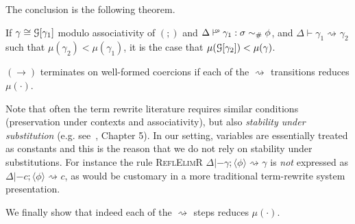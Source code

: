 \documentclass[a4paper,UKenglish]{lipics}
\def\fiddle#1{\hspace*{-0.8ex}\raisebox{0.1ex}{$\scriptscriptstyle#1$}}
\def\rulename#1{\textsc{#1}}
\newcommand{\wfco}{\vdash^{\fiddle{\sf{co}}}}
\newcommand{\psim}{\mathrel{\sim_{\tiny \#}}}
\def\rulename#1{\textsc{#1}}
\newcommand{\refl}[1]{\langle#1\rangle}  %
\newcommand{\rsa}[1]{\rightsquigarrow_{#1}}
\begin{document}
The conclusion is the following theorem.
\begin{theorem}
If $\gamma \cong {\cal G}[\gamma_1]$ modulo associativity of $(;)$ and $\Delta \wfco \gamma_1 : \sigma \psim \phi$, and 
$\Delta \vdash \gamma_1 \rsa{} \gamma_2$ such that $\mu(\gamma_2) < \mu(\gamma_1)$, it is the case that $\mu({\cal G}[\gamma_2]) < \mu(\gamma)$.
\end{theorem}

\begin{corollary} 
$(\longrightarrow)$ terminates on well-formed coercions if each of the $\rsa{}$ transitions reduces $\mu(\cdot)$. 
\end{corollary}

Note that often the term rewrite literature requires similar
conditions (preservation under contexts and associativity), but also
{\em stability under substitution} (e.g. see~\cite{Baader:1998:TR:280474},
Chapter 5). In our setting, variables are essentially treated as
constants and this is the reason that we do not rely on stability
under substitutions. For instance the rule \rulename{ReflElimR}
$\Delta |- \gamma;\refl{\phi} \rsa{} \gamma$ is {\em not} expressed as
$\Delta |- c;\refl{\phi} \rsa{} c$, as would be customary in a more
traditional term-rewrite system presentation.

We finally show that indeed each of the $\rsa{}$ steps reduces $\mu(\cdot)$.
\end{document}
